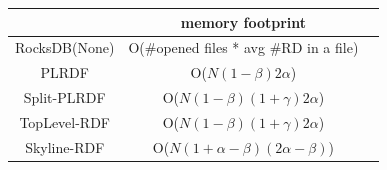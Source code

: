     \begin{center}
        \begin{tabular}{ |c|c|c| } 
         \hline
          & memory footprint  \\ 
         \hline
         RocksDB(None) & O(\#opened files * avg \#RD in a file)  \\ 
         \hline
         PLRDF & O($N(1-\beta)2\alpha$)  \\ 
         \hline
         Split-PLRDF & O($N(1-\beta)(1+\gamma)2\alpha$)  \\ 
         \hline
         TopLevel-RDF & O($N(1-\beta)(1+\gamma)2\alpha$)  \\ 
         \hline
         Skyline-RDF &  O($N(1+\alpha-\beta)(2\alpha-\beta)$)  \\ 
         \hline
        \end{tabular}
        \end{center}

